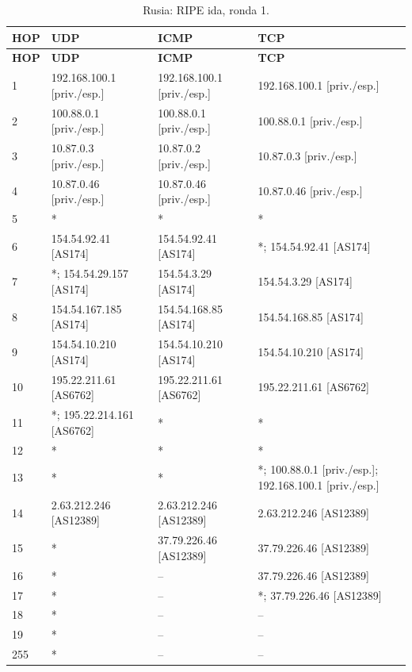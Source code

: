 \begingroup
\fontsize{9}{11}\selectfont
\begin{longtable}{p{0.95cm}p{4.716666666666667cm}p{4.716666666666667cm}p{4.716666666666667cm}}
\caption{Rusia: RIPE ida, ronda 1.}\label{anexo:ripe:37.79.226.46:1} \\
\toprule
\textbf{HOP} & \textbf{UDP} & \textbf{ICMP} & \textbf{TCP} \\ \midrule
\endfirsthead
\toprule
\textbf{HOP} & \textbf{UDP} & \textbf{ICMP} & \textbf{TCP} \\ \midrule
\endhead
1 & 192.168.100.1 [priv./esp.] & 192.168.100.1 [priv./esp.] & 192.168.100.1 [priv./esp.] \\
2 & 100.88.0.1 [priv./esp.] & 100.88.0.1 [priv./esp.] & 100.88.0.1 [priv./esp.] \\
3 & 10.87.0.3 [priv./esp.] & 10.87.0.2 [priv./esp.] & 10.87.0.3 [priv./esp.] \\
4 & 10.87.0.46 [priv./esp.] & 10.87.0.46 [priv./esp.] & 10.87.0.46 [priv./esp.] \\
5 & * & * & * \\
6 & 154.54.92.41 [AS174] & 154.54.92.41 [AS174] & *; 154.54.92.41 [AS174] \\
7 & *; 154.54.29.157 [AS174] & 154.54.3.29 [AS174] & 154.54.3.29 [AS174] \\
8 & 154.54.167.185 [AS174] & 154.54.168.85 [AS174] & 154.54.168.85 [AS174] \\
9 & 154.54.10.210 [AS174] & 154.54.10.210 [AS174] & 154.54.10.210 [AS174] \\
10 & 195.22.211.61 [AS6762] & 195.22.211.61 [AS6762] & 195.22.211.61 [AS6762] \\
11 & *; 195.22.214.161 [AS6762] & * & * \\
12 & * & * & * \\
13 & * & * & *; 100.88.0.1 [priv./esp.]; 192.168.100.1 [priv./esp.] \\
14 & 2.63.212.246 [AS12389] & 2.63.212.246 [AS12389] & 2.63.212.246 [AS12389] \\
15 & * & 37.79.226.46 [AS12389] & 37.79.226.46 [AS12389] \\
16 & * & -- & 37.79.226.46 [AS12389] \\
17 & * & -- & *; 37.79.226.46 [AS12389] \\
18 & * & -- & -- \\
19 & * & -- & -- \\
255 & * & -- & -- \\
\bottomrule
\end{longtable}
\endgroup
\begingroup
